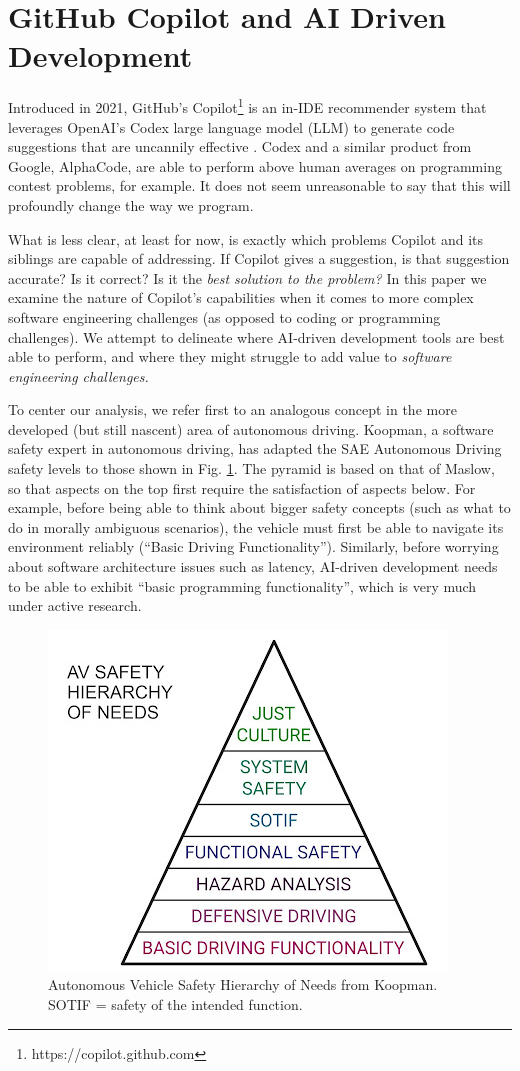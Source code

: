\section{GitHub Copilot and AI Driven Development}
Introduced in 2021, GitHub's Copilot\footnote{https://copilot.github.com} is an in-IDE recommender system that leverages OpenAI's Codex \cite{copilot} large language model (LLM) to generate code suggestions that are uncannily effective \cite{copilot}. Codex and a similar product from Google, AlphaCode, are able to perform above human averages on programming contest problems, for example. It does not seem unreasonable to say that this will profoundly change the way we program.

What is less clear, at least for now, is exactly which problems Copilot and its siblings are capable of addressing. If Copilot gives a suggestion, is that suggestion accurate? Is it correct? Is it the \emph{best solution to the problem?} 
In this paper we examine the nature of Copilot's capabilities when it comes to more complex software engineering challenges (as opposed to coding or programming challenges). We attempt to delineate where AI-driven development tools are best able to perform, and where they might struggle to add value to \emph{software engineering challenges.}

To center our analysis, we refer first to an analogous concept in the more developed (but still nascent) area of autonomous driving. 
Koopman, a software safety expert in autonomous driving, has adapted the SAE Autonomous Driving safety levels \cite{sae} to those shown in Fig. \ref{fig:koopman_pyramid}. 
The pyramid is based on that of Maslow, so that aspects on the top first require the satisfaction of aspects below. 
For example, before being able to think about bigger safety concepts (such as what to do in morally ambiguous scenarios), the vehicle must first be able to navigate its environment reliably (``Basic Driving Functionality'').
Similarly, before worrying about software architecture issues such as latency, AI-driven development needs to be able to exhibit ``basic programming functionality'', which is very much under active research.

\begin{figure}
    \includegraphics[width=\linewidth]{Figures/koopman_pyramid.jpeg}
    \caption{Autonomous Vehicle Safety Hierarchy of Needs from Koopman\cite{koopman}. SOTIF = safety of the intended function.}
    \label{fig:koopman_pyramid}
\end{figure}
